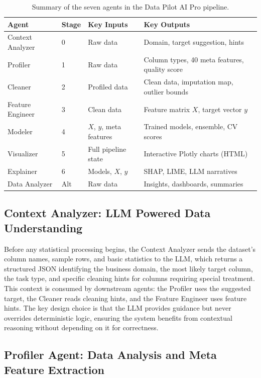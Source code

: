 \documentclass{article}
\begin{document}
\begin{table}[h]
\centering
\caption{Summary of the seven agents in the Data Pilot AI Pro pipeline.}
\label{tab:agents}
\begin{tabular}{@{}llll@{}}
\toprule
\textbf{Agent} & \textbf{Stage} & \textbf{Key Inputs} & \textbf{Key Outputs} \\
\midrule
Context Analyzer & 0 & Raw data & Domain, target suggestion, hints \\
Profiler & 1 & Raw data & Column types, 40 meta features, quality score \\
Cleaner & 2 & Profiled data & Clean data, imputation map, outlier bounds \\
Feature Engineer & 3 & Clean data & Feature matrix $X$, target vector $y$ \\
Modeler & 4 & $X$, $y$, meta features & Trained models, ensemble, CV scores \\
Visualizer & 5 & Full pipeline state & Interactive Plotly charts (HTML) \\
Explainer & 6 & Models, $X$, $y$ & SHAP, LIME, LLM narratives \\
Data Analyzer & Alt & Raw data & Insights, dashboards, summaries \\
\bottomrule
\end{tabular}
\end{table}

\subsection{Context Analyzer: LLM Powered Data Understanding}

Before any statistical processing begins, the Context Analyzer sends the 
dataset's column names, sample rows, and basic statistics to the LLM, which 
returns a structured JSON identifying the business domain, the most likely 
target column, the task type, and specific cleaning hints for columns requiring 
special treatment. This context is consumed by downstream agents: the Profiler 
uses the suggested target, the Cleaner reads cleaning hints, and the Feature 
Engineer uses feature hints. The key design choice is that the LLM provides 
guidance but never overrides deterministic logic, ensuring the system benefits 
from contextual reasoning without depending on it for correctness.

\subsection{Profiler Agent: Data Analysis and Meta Feature Extraction}
\end{document}
